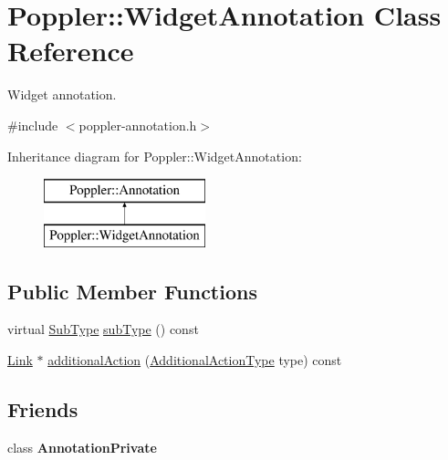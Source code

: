 \hypertarget{class_poppler_1_1_widget_annotation}{}\section{Poppler\+:\+:Widget\+Annotation Class Reference}
\label{class_poppler_1_1_widget_annotation}


Widget annotation.  




{\ttfamily \#include $<$poppler-\/annotation.\+h$>$}

Inheritance diagram for Poppler\+:\+:Widget\+Annotation\+:\begin{figure}[H]
\begin{center}
\leavevmode
\includegraphics[height=2.000000cm]{class_poppler_1_1_widget_annotation}
\end{center}
\end{figure}
\subsection*{Public Member Functions}
\begin{DoxyCompactItemize}
\item 
virtual \hyperlink{class_poppler_1_1_annotation_a2d592999c330949d64679cfa9e81113f}{Sub\+Type} \hyperlink{class_poppler_1_1_widget_annotation_a7ddc61e33e4418459f3a266ceea2b5a4}{sub\+Type} () const
\item 
\hyperlink{class_poppler_1_1_link}{Link} $\ast$ \hyperlink{class_poppler_1_1_widget_annotation_aa0c058e4a88b0abf9d717fe7f688a548}{additional\+Action} (\hyperlink{class_poppler_1_1_annotation_adab1fa85588b8f9fcdf20cdf37c1be97}{Additional\+Action\+Type} type) const
\end{DoxyCompactItemize}
\subsection*{Friends}
\begin{DoxyCompactItemize}
\item 
\mbox{\label{class_poppler_1_1_widget_annotation_add0bc3e32e560f9e9eb3025587c1ad54}} 
class {\bfseries Annotation\+Private}
\end{DoxyCompactItemize}
